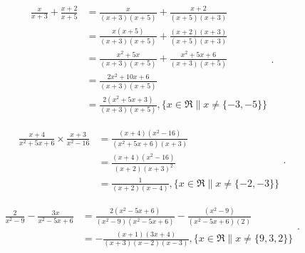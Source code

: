 \begin{question}

  \begin{equation}
    \begin{split}
      \frac{x}{x + 3} + \frac{x + 2}{x + 5}
            &= \frac{x}{(x + 3)(x + 5)} + \frac{x + 2}{(x + 5)(x + 3)} \\
            &= \frac{x(x + 5)}{(x + 3)(x + 5)} + \frac{(x + 2)(x + 3)}{(x + 5)(x + 3)} \\
            &= \frac{x^2 + 5x}{(x + 3)(x + 5)} + \frac{x^2 + 5x + 6}{(x + 3)(x + 5)}\\
            &= \frac{2x^2 + 10x + 6}{(x + 3)(x + 5)} \\
            &= \boxed{\frac{2(x^2 + 5x + 3)}{(x + 3)(x + 5)}, \{ x \in \Re \| x \neq \{ -3, -5 \} \}}
    \end{split}
  .\end{equation}
\end{question}

\begin{question}

  \begin{equation}
    \begin{split}
      \frac{x + 4}{x^2 + 5x + 6} \times \frac{x + 3}{x^2 - 16}
            &= \frac{(x + 4)(x^2 - 16)}{(x^2 + 5x + 6)(x + 3)} \\
            &= \frac{(x + 4)(x^2 - 16)}{(x + 2)(x + 3)^2} \\
            &= \boxed{\frac{1}{(x + 2)(x - 4)}, \{ x \in \Re \| x \neq \{ -2, -3 \} \}}
    \end{split}
  .\end{equation}
\end{question}

\begin{question}

  \begin{equation}
    \begin{split}
      \frac{2}{x^2 - 9} - \frac{3x}{x^2 - 5x + 6}
            &= \frac{2(x^2 - 5x + 6)}{(x^2 - 9)(x^2 - 5x + 6)} - \frac{(x^2 - 9)}{(x^2 - 5x + 6)(2)} \\
            &= \boxed{- \frac{(x + 1)(3x + 4)}{(x + 3)(x - 2)(x - 3)}, \{ x \in \Re \| x \neq \{ 9, 3, 2 \} \}}
    \end{split}
  .\end{equation}
\end{question}

